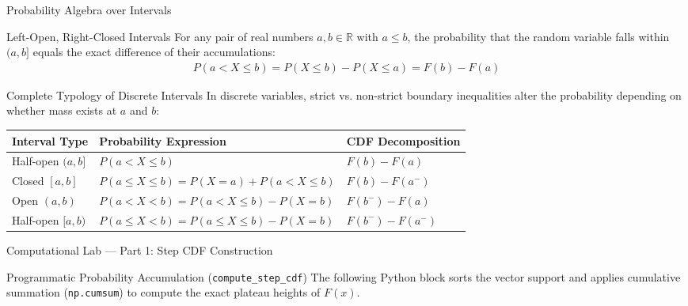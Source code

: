 \documentclass[aspectratio=169,xcolor={dvipsnames,table}]{beamer}
\begin{document}
\begin{frame}{Probability Algebra over Intervals}
	\begin{block}{Left-Open, Right-Closed Intervals}
		\footnotesize
		For any pair of real numbers $a, b \in \mathbb{R}$ with $a \le b$, the probability that the random variable falls within $(a, b]$ equals the exact difference of their accumulations:
		\begin{align*}
			P(a < X \le b) = P(X \le b) - P(X \le a) = F(b) - F(a)
		\end{align*}
	\end{block}
	\vspace{-0.15cm}
	\begin{block}{Complete Typology of Discrete Intervals}
		\scriptsize
		In discrete variables, strict vs. non-strict boundary inequalities alter the probability depending on whether mass exists at $a$ and $b$:
		\begin{table}
			\centering
			\begin{tabular}{l|l|l}
				\hline
				\textbf{Interval Type} & \textbf{Probability Expression} & \textbf{CDF Decomposition} \\
				\hline \hline
				Half-open $(a, b]$ & $P(a < X \le b)$ & $F(b) - F(a)$ \\
				\hline
				Closed $[a, b]$ & $P(a \le X \le b) = P(X=a) + P(a < X \le b)$ & $F(b) - F(a^-)$ \\
				\hline
				Open $(a, b)$ & $P(a < X < b) = P(a < X \le b) - P(X=b)$ & $F(b^-) - F(a)$ \\
				\hline
				Half-open $[a, b)$ & $P(a \le X < b) = P(a \le X \le b) - P(X=b)$ & $F(b^-) - F(a^-)$ \\
				\hline
			\end{tabular}
		\end{table}
	\end{block}
\end{frame}

\begin{frame}[fragile]{Computational Lab --- Part 1: Step CDF Construction}
	\begin{block}{Programmatic Probability Accumulation (\texttt{compute\_step\_cdf})}
		\scriptsize
		The following Python block sorts the vector support and applies cumulative summation (\texttt{np.cumsum}) to compute the exact plateau heights of $F(x)$.
	\end{block}
	\vspace{-0.1cm}
	
\end{frame}
\end{document}
